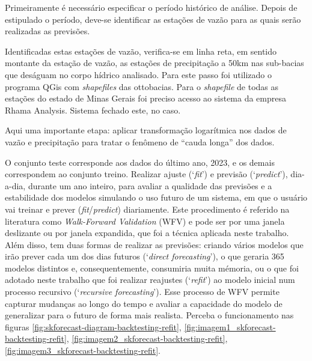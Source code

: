 Primeiramente é necessário especificar o período histórico de análise. Depois de estipulado o período, deve-se identificar as estações de vazão para as quais serão realizadas as previsões.

Identificadas estas estações de vazão, verifica-se em linha reta, em sentido montante da estação de vazão, as estações de precipitação a 50km nas sub-bacias que deságuam no corpo hídrico analisado. Para este passo foi utilizado o programa QGis com \textit{shapefiles} das ottobacias.\cite{snirh_ottobacia_2024} Para o \textit{shapefile} de todas as estações do estado de Minas Gerais foi preciso acesso ao sistema da empresa Rhama Analysis. Sistema fechado este, no caso.


Aqui uma importante etapa: aplicar transformação logarítmica nos dados de vazão e precipitação para tratar o fenômeno de ``cauda longa'' dos dados.

O conjunto teste corresponde aos dados do último ano, 2023, e os demais correspondem ao conjunto treino. Realizar ajuste (`\textit{fit}') e previsão (`\textit{predict}'), dia-a-dia, durante um ano inteiro, para avaliar a qualidade das previsões e a estabilidade dos modelos simulando o uso futuro de um sistema, em que o usuário vai treinar e prever (\textit{fit}/\textit{predict}) diariamente. Este procedimento é referido na literatura como \textit{Walk-Forward Validation} (WFV) e pode ser por uma janela deslizante ou por janela expandida, que foi a técnica aplicada neste trabalho. Além disso, tem duas formas de realizar as previsões: criando vários modelos que irão prever cada um dos dias futuros (`\textit{direct forecasting}'), o que geraria 365 modelos distintos e, consequentemente, consumiria muita mémoria, ou o que foi adotado neste trabalho que foi realizar reajustes (`\textit{refit}') ao modelo inicial num processo recursivo (`\textit{recursive forecasting}'). Esse processo de WFV permite capturar mudanças ao longo do tempo e avaliar a capacidade do modelo de generalizar para o futuro de forma mais realista. Perceba o funcionamento nas figuras \ref{fig:skforecast-diagram-backtesting-refit}, \ref{fig:imagem1_skforecast-backtesting-refit}, \ref{fig:imagem2_skforecast-backtesting-refit}, \ref{fig:imagem3_skforecast-backtesting-refit}.

